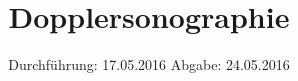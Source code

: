 
\subject{US3}
\title{Dopplersonographie}
\date{
  Durchführung: 17.05.2016
  \hspace{3em}
  Abgabe: 24.05.2016
}



\maketitle
\newpage
\mbox{}
\newpage
\thispagestyle{empty}
\tableofcontents
\newpage






\nocite{numpy}
\nocite{matplotlib}
\nocite{uncertainties}
\printbibliography


